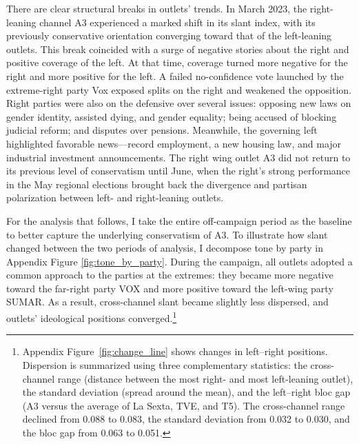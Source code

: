\documentclass[12pt]{article}
\begin{document}
There are clear structural breaks in outlets’ trends. In March 2023, the right-leaning channel A3 experienced a marked shift in its slant index, with its previously conservative orientation converging toward that of the left-leaning outlets. This break coincided with a surge of negative stories about the right and positive coverage of the left. At that time, coverage turned more negative for the right and more positive for the left. A failed no-confidence vote launched by the extreme-right party Vox exposed splits on the right and weakened the opposition. Right parties were also on the defensive over several issues: opposing new laws on gender identity, assisted dying, and gender equality; being accused of blocking judicial reform; and disputes over pensions. Meanwhile, the governing left highlighted favorable news—record employment, a new housing law, and major industrial investment announcements. The right wing outlet A3 did not return to its previous level of conservatism until June, when the right’s strong performance in the May regional elections brought back the  divergence and partisan polarization between left- and right-leaning outlets. 



For the analysis that follows, I take the entire off-campaign period as the baseline to better capture the underlying conservatism of A3. To illustrate how slant changed between the two periods of analysis, I decompose tone by party in Appendix Figure \ref{fig:tone_by_party}. During the campaign, all outlets adopted a common approach to the parties at the extremes: they became more negative toward the far-right party VOX and more positive toward the left-wing party SUMAR. As a result, cross-channel slant became slightly less dispersed, and outlets’ ideological positions converged.\footnote{Appendix Figure~\ref{fig:change_line} shows changes in left–right positions. Dispersion is summarized using three complementary statistics: the cross-channel range (distance between the most right- and most left-leaning outlet), the standard deviation (spread around the mean), and the left–right bloc gap (A3 versus the average of La Sexta, TVE, and T5). The cross-channel range declined from 0.088 to 0.083, the standard deviation from 0.032 to 0.030, and the bloc gap from 0.063 to 0.051.}
\end{document}
